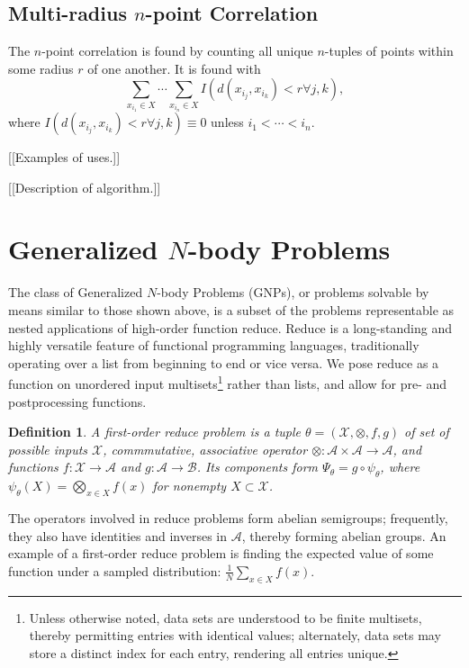 \documentclass{article}
\newtheorem{definition} {Definition}
\newcommand{\comp}{\mathop{\circ}\nolimits}
\begin{document}
\subsection{Multi-radius $n$-point Correlation}

The $n$-point correlation is found by counting all unique $n$-tuples
of points within some radius $r$ of one another.  It is found with
\[
\sum_{x_{i_1} \in X} \cdots \sum_{x_{i_n} \in X} I(d(x_{i_j},x_{i_k}) < r \forall j,k),
\]
where $I(d(x_{i_j},x_{i_k}) < r \forall j,k) \equiv 0$ unless $i_1 <
\cdots < i_n$.

[[Examples of uses.]]

[[Description of algorithm.]]

\section{Generalized $N$-body Problems}

The class of Generalized $N$-body Problems (GNPs), or problems
solvable by means similar to those shown above, is a subset of the
problems representable as nested applications of high-order function
reduce.  Reduce is a long-standing and highly versatile feature of
functional programming languages, traditionally operating over a list
from beginning to end or vice versa.  We pose reduce as a function on
unordered input multisets\footnote{Unless otherwise noted, data sets
are understood to be finite multisets, thereby permitting entries with
identical values; alternately, data sets may store a distinct index
for each entry, rendering all entries unique.} rather than lists, and
allow for pre- and postprocessing functions.
\begin{definition}
  A {\em first-order reduce problem} is a tuple $\theta =
  (\mathcal{X},\otimes,f,g)$ of set of possible inputs $\mathcal{X}$,
  commmutative, associative operator $\otimes \colon \mathcal{A}
  \times \mathcal{A} \to \mathcal{A}$, and functions $f \colon
  \mathcal{X} \to \mathcal{A}$ and $g \colon \mathcal{A} \to
  \mathcal{B}$.  Its components form $\Psi_{\theta} = g \comp
  \psi_{\theta}$, where $\psi_{\theta}(X) = \bigotimes_{x \in X} f(x)$
  for nonempty $X \subset \mathcal{X}$.
\end{definition}
\noindent The operators involved in reduce problems form abelian
semigroups; frequently, they also have identities and inverses in
$\mathcal{A}$, thereby forming abelian groups.  An example of a
first-order reduce problem is finding the expected value of some
function under a sampled distribution: $\frac{1}{N} \sum_{x \in X}
f(x)$.
\end{document}
